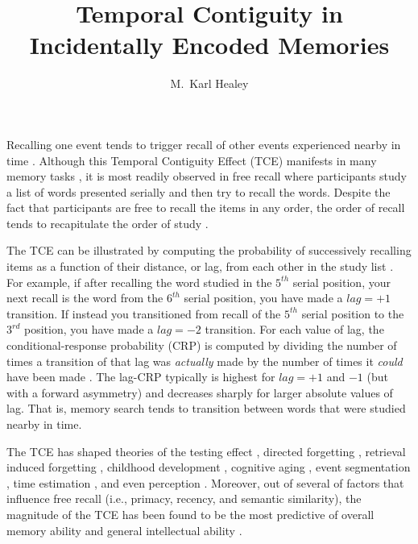 \documentclass[man,natbib,floatsintext]{apa6} %
\title{Temporal Contiguity in Incidentally Encoded Memories}
\author{M.\ Karl Healey}
\affiliation{Michigan State University}
\begin{document}
\maketitle

Recalling one event tends to trigger recall of other events experienced nearby in time \citep[for a review, see][]{HealKaha17}. Although this Temporal Contiguity Effect (TCE) manifests in many memory tasks \citep{DaviEtal08,SchwEtal05}, it is most readily observed in free recall where participants study a list of words presented serially and then try to recall the words. Despite the fact that participants are free to recall the items in any order, the order of recall tends to recapitulate the order of study \citep{Murd74,Post71,Post72,Kaha96}. 

The TCE can be illustrated by computing the probability of successively recalling items as a function of their distance, or lag, from each other in the study list \citep{Kaha96}. For example, if after recalling the word studied in the $5^{th}$ serial position, your next recall is the word from the $6^{th}$ serial position, you have made a $lag=+1$ transition. If instead you transitioned from recall of the $5^{th}$ serial position to the $3^{rd}$ position, you have made a $lag=-2$ transition. For each value of lag, the conditional-response probability (CRP) is computed by dividing the number of times a transition of that lag was \emph{actually} made by the number of times it \emph{could} have been made \citep[e.g., if you have just recalled the last item in the list, it is not possible to make a $lag=+1$ transition. Transitions to already recalled items are also excluded from the counts as subjects rarely repeat items;][]{Kaha96}. The lag-CRP typically is highest for $lag=+1$ and $-1$ (but with a forward asymmetry) and decreases sharply for larger absolute values of lag. That is, memory search tends to transition between words that were studied nearby in time.

The TCE has shaped theories of the testing effect \citep{KarpEtal14}, directed forgetting \citep{SahaEtal13}, retrieval induced forgetting \citep{KlieBaum16}, childhood development \citep{JarroEtal15}, cognitive aging \citep{WahlHuff15,HealKaha15}, event segmentation \citep{EzzyDava14}, time estimation \citep{SahaSmit13}, and even perception \citep{TurkEtal12}. Moreover, out of several of factors that influence free recall (i.e., primacy, recency, and semantic similarity), the magnitude of the TCE has been found to be the most predictive of overall memory ability \citep{SedeEtal10,SpilUnsw11} and general intellectual ability \citep{HealEtal14}.
\end{document}
